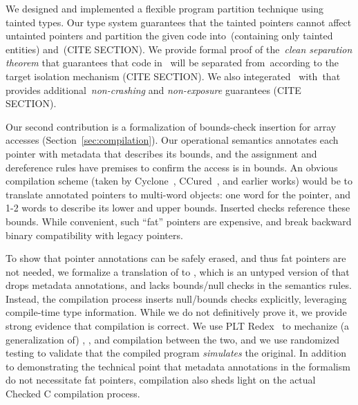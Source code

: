 We designed and implemented a flexible program partition technique using tainted types.
Our type system guarantees that the tainted pointers cannot affect untainted pointers and partition the given code into~\ucregion (containing only tainted entities) and~\cregion (CITE SECTION).
We provide formal proof of the~\emph{clean separation theorem} that guarantees that code in ~\cregion will be separated from~\ucregion according to the target isolation mechanism (CITE SECTION).
We also integerated~\systemname{} with~\checkedc that provides additional~\emph{non-crashing} and \emph{non-exposure} guarantees (CITE SECTION).

 Our second
contribution is a formalization of bounds-check insertion for array
accesses (Section~\ref{sec:compilation}). Our operational semantics
annotates each pointer with metadata that describes its bounds, and
the assignment and dereference rules have premises to confirm the
access is in bounds. An obvious compilation scheme (taken by
Cyclone~\cite{Jim2002,GrossmanMJHWC02}, CCured~\cite{Necula2005}, and
earlier works) would be to translate annotated pointers to multi-word
objects: one word for the pointer, and 1-2 words to describe its lower
and upper bounds. Inserted checks reference these bounds. While
convenient, such ``fat'' pointers are expensive, and break backward
binary compatibility with legacy pointers.

  To show that pointer annotations can be safely
  erased, and thus fat pointers are not needed, we formalize a
  translation of \lang to \elang, which is an 
  untyped version of \lang that drops metadata annotations, and
  lacks bounds/null checks in the semantics rules. Instead,
  the compilation process inserts null/bounds checks explicitly, leveraging
  compile-time type information. While we do not definitively prove
  it, we provide strong evidence that compilation is correct. We use PLT
  Redex~\cite{pltredex} to mechanize (a generalization of) \lang, 
  \elang, and compilation between the two, and we use randomized testing 
to validate that the compiled program \emph{simulates} the
original. In addition to demonstrating the technical point that metadata
annotations in the \lang formalism do not necessitate fat pointers,
compilation also sheds light on the actual Checked C compilation
process. 

